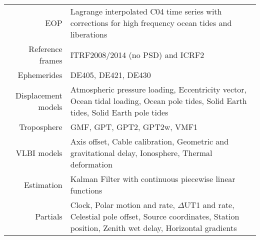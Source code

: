 \color{black}
\begin{tabularx}{\columnwidth}{r|X}
  \textcolor{black!99}{EOP}
    & \textcolor{black!99}{Lagrange interpolated C04 time series with
                           corrections for high frequency ocean tides and
                           liberations} \\
\textcolor{black!60}{Reference frames}
    & \textcolor{black!60}{ITRF2008/2014 (no PSD) and ICRF2} \\
  \textcolor{black!99}{Ephemerides}
    & \textcolor{black!99}{DE405, DE421, DE430} \\
  \textcolor{black!60}{Displacement models}
    & \textcolor{black!60}{Atmospheric pressure loading, Eccentricity vector,
                           Ocean tidal loading, Ocean pole tides, Solid Earth
                           tides, Solid Earth pole tides} \\
  \textcolor{black!99}{Troposphere}
    & \textcolor{black!99}{GMF, GPT, GPT2, GPT2w, VMF1} \\
  \textcolor{black!60}{VLBI models}
    & \textcolor{black!60}{Axis offset, Cable calibration, Geometric and
                           gravitational delay, Ionosphere, Thermal
                           deformation} \\
  \textcolor{black!99}{Estimation}
    & \textcolor{black!99}{Kalman Filter with continuous piecewise linear
                           functions} \\
  \textcolor{black!60}{Partials}
    & \textcolor{black!60}{Clock, Polar motion and rate, $\Delta$UT1 and rate,
                           Celestial pole offset, Source coordinates, Station
                           position, Zenith wet delay, Horizontal gradients} \\
\end{tabularx}

\endinput
